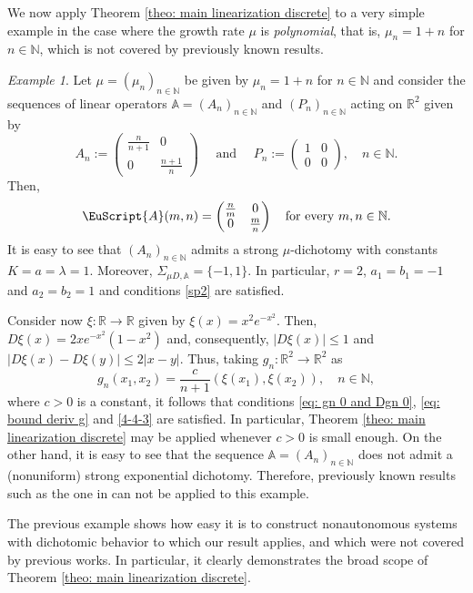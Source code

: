 \documentclass[reqno, a4paper, 10pt]{amsart}
\theoremstyle{plain}
\numberwithin{equation}{section}
\theoremstyle{remark}
\newtheorem{example}{Example}
\def\N{\mathbb{N}}
\def\cA{\EuScript{A}}
\def\R{\mathbb{R}}
\begin{document}
We now apply Theorem \ref{theo: main linearization discrete} to a very simple example in the case where the growth rate $\mu$ is \emph{polynomial}, that is, $\mu_n=1+n$ for $n\in \N$, which is not covered by previously known results.
\begin{example}\label{example: main theo discrete}
Let $\mu=(\mu_n)_{n\in \N}$ be given by $\mu_n=1+n$ for $n\in \N$ and consider the sequences of linear operators $\mathbb{A}=(A_n)_{n\in \N}$ and $(P_n)_{n\in \N}$ acting on $\R^2$ given by
\[
A_n:=\begin{pmatrix}
\frac{n}{n+1} & 0\\
0 & \frac{n+1}{n}
\end{pmatrix} \quad\text{ and }\quad P_n:=\begin{pmatrix}
1 & 0\\
0 & 0
\end{pmatrix},\quad n\in \N.
\]
Then,
\[
\cA(m,n)=\begin{pmatrix}
\frac{n}{m} & 0\\
0 & \frac{m}{n}
\end{pmatrix} \quad  \text{for every } m,n\in \N.
\]
It is easy to see that $(A_n)_{n\in\N}$ admits a strong $\mu$-dichotomy with constants $K=a=\lambda=1$. Moreover, $\Sigma_{\mu D,\mathbb{A}}=\{-1,1\}$. In particular, $r=2$, $a_1=b_1=-1$ and $a_2=b_2=1$ and conditions \eqref{sp2} are satisfied.

Consider now $\xi\colon \R\to \R$ given by $\xi(x)=x^2e^{-x^2}$. Then, $D\xi(x)=2xe^{-x^2}(1-x^2)$ and, consequently, $|D\xi(x)|\leq 1$ and $|D\xi(x)-D\xi(y)|\leq 2|x-y|$. Thus, taking $g_n:\R^2\to \R^2$ as
\[g_n(x_1,x_2)=\frac{c}{n+1}(\xi(x_1),\xi(x_2)), \quad n\in \N,\]
where $c>0$ is a constant, it follows that conditions \eqref{eq: gn 0 and Dgn 0}, \eqref{eq: bound deriv g} and \eqref{4-4-3} are satisfied. In particular, Theorem \ref{theo: main linearization discrete} may be applied whenever $c>0$ is small enough. On the other hand, it is easy to see that the sequence  $\mathbb{A}=(A_n)_{n\in \N}$ does not admit a (nonuniform) strong exponential dichotomy. Therefore, previously known results such as the one in \cite{DZZ} can not be applied to this example.
\end{example}

The previous example shows how easy it is to construct nonautonomous systems with dichotomic behavior to which our result applies, and which were not covered by previous works. In particular, it clearly demonstrates the broad scope of Theorem \ref{theo: main linearization discrete}.
\end{document}
